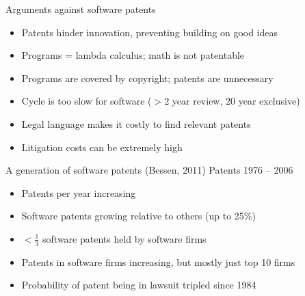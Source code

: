 \documentclass{beamer}
\begin{document}
\begin{frame}{Arguments against software patents}
\begin{itemize}
\item Patents hinder innovation, preventing building on good ideas
\item Programs = lambda calculus; math is not patentable
\item Programs are covered by copyright; patents are unnecessary
\item Cycle is too slow for software ($>$2 year review, 20 year exclusive)
\item Legal language makes it costly to find relevant patents
\item Litigation costs can be extremely high
\end{itemize}
\end{frame}

\begin{frame}{A generation of software patents (Bessen, 2011)}
Patents 1976 -- 2006
\begin{itemize}
\item Patents per year increasing
\item Software patents growing relative to others (up to 25\%)
\item $<$$\frac{1}{3}$ software patents held by software firms
\item Patents in software firms increasing, but mostly just top 10 firms
\item Probability of patent being in lawsuit tripled since 1984
\end{itemize}
\end{frame}
\end{document}
